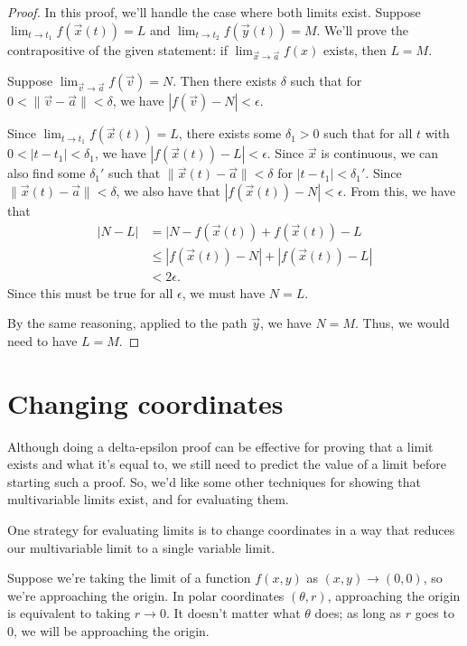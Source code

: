 \documentclass{ximera}
\begin{document}
\begin{proof}
In this proof, we'll handle the case where both limits exist. Suppose $\lim_{t\rightarrow t_1}f(\vec{x}(t)) = L$ and $\lim_{t\rightarrow t_2}f(\vec{y}(t)) = M$. We'll prove the contrapositive of the given statement: if $\lim_{\vec{x}\rightarrow\vec{a}}f(x)$ exists, then $L=M$.

Suppose $\lim_{\vec{v}\rightarrow\vec{a}}f(\vec{v})=N$. Then there exists $\delta$ such that for $0< \|\vec{v} - \vec{a}\| < \delta$, we have $|f(\vec{v}) - N| < \epsilon$.

Since $\lim_{t\rightarrow t_1}f(\vec{x}(t)) = L$, there exists some $\delta_1>0$ such that for all $t$ with $0<|t-t_1|<\delta_1$, we have $|f(\vec{x}(t))-L|<\epsilon$. Since $\vec{x}$ is continuous, we can also find some $\delta_1'$ such that $\|\vec{x}(t)-\vec{a}\|<\delta$ for $|t-t_1|<\delta_1'$. Since $\|\vec{x}(t) - \vec{a}\| < \delta$, we also have that $|f(\vec{x}(t)) - N| < \epsilon$. From this, we have that
\begin{align*}
|N-L| &= |N-f(\vec{x}(t)) + f(\vec{x}(t)) - L\\
&\leq |f(\vec{x}(t))-N| + |f(\vec{x}(t)) - L|\\
&< 2\epsilon.
\end{align*}
Since this must be true for all $\epsilon$, we must have $N=L$.

By the same reasoning, applied to the path $\vec{y}$, we have $N=M$. Thus, we would need to have $L=M$.
\end{proof}

\section*{Changing coordinates}

Although doing a delta-epsilon proof can be effective for proving that a limit exists and what it's equal to, we still need to predict the value of a limit before starting such a proof. So, we'd like some other techniques for showing that multivariable limits exist, and for evaluating them.

One strategy for evaluating limits is to change coordinates in a way that reduces our multivariable limit to a single variable limit.

Suppose we're taking the limit of a function $f(x,y)$ as $(x,y)\rightarrow (0,0)$, so we're approaching the origin. In polar coordinates $(\theta, r)$, approaching the origin is equivalent to taking $r\rightarrow 0$. It doesn't matter what $\theta$ does; as long as $r$ goes to $0$, we will be approaching the origin.
\end{document}
